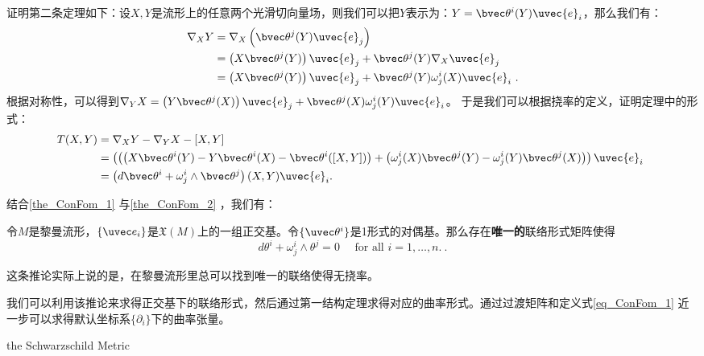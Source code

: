 证明第二条定理如下：设$X,Y$是流形上的任意两个光滑切向量场，则我们可以把$Y$表示为：$Y=\bvec \theta^i(Y)\uvec{e}_i$，那么我们有：
\begin{equation}
\begin{aligned}
\nabla_{X} Y & =\nabla_{X}\left(\bvec\theta^{j}(Y) \uvec{e}_{j}\right) \\
& =\left(X \bvec\theta^{j}(Y)\right) \uvec{e}_{j}+\bvec\theta^{j}(Y) \nabla_{X} \uvec{e}_{j} \\
& =\left(X \bvec \theta^{j}(Y)\right) \uvec{e}_{j}+\bvec\theta^{j}(Y) \omega_{j}^{i}(X) \uvec{e}_{i}~.
\end{aligned}
\end{equation}
根据对称性，可以得到$\nabla_{Y} X =\left(Y \bvec \theta^{j}(X)\right) \uvec{e}_{j}+\bvec\theta^{j}(X) \omega_{j}^{i}(Y) \uvec{e}_{i}$。
于是我们可以根据挠率的定义，证明定理中的形式：
\begin{equation}
\begin{aligned}
T(X, Y) & =\nabla_{X} Y-\nabla_{Y} X-[X, Y] \\
& =\left(\left(\left(X \bvec\theta^{i}(Y)-Y \bvec\theta^{i}(X)-\bvec\theta^{i}([X, Y])\right)+\left(\omega_{j}^{i}(X) \bvec\theta^{j}(Y)-\omega_{j}^{i}(Y) \bvec\theta^{j}(X)\right)\right) \uvec{e}_{i}\right. \\
& =\left(d \bvec \theta^{i}+\omega_{j}^{i} \wedge \bvec \theta^{j}\right)(X, Y) \uvec{e}_{i}.
\end{aligned}~
\end{equation}


结合\autoref{the_ConFom_1} 与\autoref{the_ConFom_2} ，我们有：

\begin{corollary}{}
令$M$是黎曼流形，$\{\uvec e_i\}$是$\mathfrak{X}(M)$上的一组正交基。令$\{\uvec\theta^i\}$是1形式的对偶基。那么存在\textbf{唯一的}联络形式矩阵使得
\begin{equation}
d \theta^{i}+\omega_{j}^{i} \wedge \theta^{j}=0 \quad \text { for all } i=1, \ldots, n .~.
\end{equation}
\end{corollary}
这条推论实际上说的是，在黎曼流形里总可以找到唯一的联络使得无挠率。

我们可以利用该推论来求得正交基下的联络形式，然后通过第一结构定理求得对应的曲率形式。通过过渡矩阵和定义式\autoref{eq_ConFom_1} 近一步可以求得默认坐标系$\{\partial_i\}$下的曲率张量。
\begin{example}{the Schwarzschild Metric}

\end{example}




